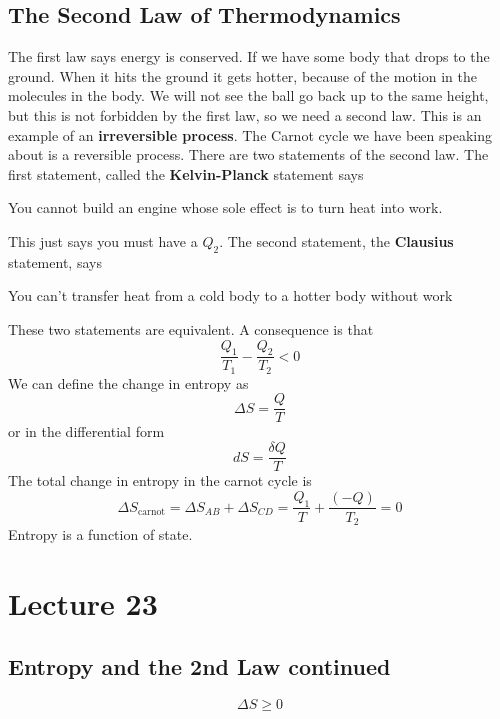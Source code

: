 \documentclass{report}
\numberwithin{equation}{section}
\begin{document}
\subsection{The Second Law of Thermodynamics}
The first law says energy is conserved. If we have some body that drops to the ground. When it hits the ground it gets hotter, because of the motion in the molecules in the body. We will not see the ball go back up to the same height, but this is not forbidden by the first law, so we need a second law. 
This is an example of an \textbf{irreversible process}. The Carnot cycle we have been speaking about is a reversible process.  There are two statements of the second law. The first statement, called the \textbf{Kelvin-Planck} statement says 
\begin{center}
    You cannot build an engine whose sole effect is to turn heat into work. 
\end{center}
This just says you must have a $Q_2$. The second statement, the \textbf{Clausius} statement, says
\begin{center}
    You can't transfer heat from a cold body to a hotter body without work
\end{center}
These two statements are equivalent. A consequence is that 
\begin{equation}
    \frac{Q_1}{T_1} - \frac{Q_2}{T_2} < 0
\end{equation}
We can define the change in entropy as 
\begin{equation}
    \Delta S = \frac{Q}{T}
\end{equation}
or in the differential form 
\begin{equation}
    dS = \frac{\delta Q}{T}
\end{equation}
The total change in entropy in the carnot cycle is 
\begin{equation}
    \Delta S_{\text{carnot}} = \Delta S_{AB} + \Delta S_{CD} = \frac{Q_1}{T} + \frac{(-Q)}{T_2} = 0
\end{equation}
Entropy is a function of state. 
\section{Lecture 23}
\subsection{Entropy and the 2nd Law continued}
\begin{equation}
    \Delta S \geq 0
\end{equation}
\end{document}
